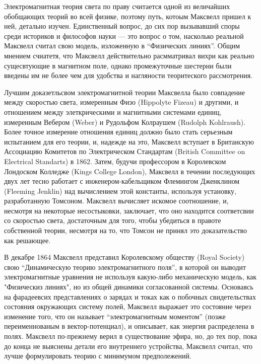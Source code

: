 \documentclass[12pt, oneside, a4paper]{article}
\begin{document}
Электромагнитная теория света по праву считается одной из величайших обобщающих теорий во всей физике, поэтому путь, котоым Максвелл пришел к ней, детально изучен. Единственный вопрос, до сих пор вызывавший споры среди историков и философов науки --- это вопрос о том, насколько реальной Максвелл считал свою модель, изложенную в ``Физических линиях''. Общим мнением счиатетя, что Максвелл действительно расмматривал вихри как реально сущесвтующие в магнитном поле, однако промежуточные шестерни были введены им не более чем для удобства и нагляности теоритеского рассмотрения. 

Лучшим доказетльсвом электромагнитной теории Максвелла было совпадение между скоростью света, измеренным Физо (Hippolyte Fizeau) и другими, и отношением между элеткрическими и магнитными системами единиц, измеренным Вебером (Weber) и Рудольфом Колраушем (Rudolph Kohlraush). Более точное измерение отношения единиц должно было стать серьезным испытанием для его теории, и, надежде на это, Максвелл вступает в Британскую Ассоциацию Комитетов по Электрическом Стандартам (British Committee on Electrical Standarts) в 1862. Затем, будучи профессором в Королевском Лондоском Колледже (Kings College London), Максвелл в течении последующих двух лет тесно работает с инженером-кабельщиком Флемингом Дженклином (Fleeming Jenklin) над вычислением этой константы, используя установку, разработанную Томсоном. Максвелл вычисляет искомое соотношение, и, несмотря на некоторые несостыковки, заключает, что оно находится соответсвии со скоростью света, достаточным для того, чтобы убедиться в правоте собственной теории, несмотря на то, что Томсон не принял это доказательство как решающее. 

В декабре 1864 Максвелл представил Королевскому обществу (Royal Society) свою ``Динамическую теорию электромагнитного поля'', в которой он выводит электромагнитные уравнения не используя какую-либо механическую модель, как "Физическиз линиях", но из общей динамики согласованной системы. Основаясь на фарадеевсих представлениях о зарядах и токах как о побочных свидетельствах состояния окружающих систему полей, Максвелл выражает это состояние через изменение того, что он называет ``электромагнитным моментом'' (позже переименнованым в вектор-потенциал), и описывает, как энергия распределена в полях. Максвелл по-прежнему верил в существование эфира, но, до тех пор, пока до конца не выяснены детали его внутреннего устройства, Максвелл считал, что лучше формулировать теорию с минимумом предполежений. 
\end{document}
